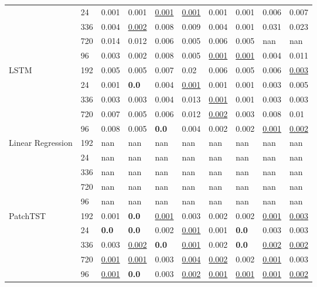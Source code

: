 \begin{tabular}{llllllllll}
 & 24 & 0.001 & 0.001 & \underline{0.001} & \underline{0.001} & 0.001 & 0.001 & 0.006 & 0.007 \\
 & 336 & 0.004 & \underline{0.002} & 0.008 & 0.009 & 0.004 & 0.001 & 0.031 & 0.023 \\
 & 720 & 0.014 & 0.012 & 0.006 & 0.005 & 0.006 & 0.005 & nan & nan \\
 & 96 & 0.003 & 0.002 & 0.008 & 0.005 & \underline{0.001} & \underline{0.001} & 0.004 & 0.011 \\
\cline{1-10}
\multirow[t]{5}{*}{LSTM} & 192 & 0.005 & 0.005 & 0.007 & 0.02 & 0.006 & 0.005 & 0.006 & \underline{0.003} \\
 & 24 & 0.001 & \textbf{0.0} & 0.004 & \underline{0.001} & 0.001 & 0.001 & 0.003 & 0.005 \\
 & 336 & 0.003 & 0.003 & 0.004 & 0.013 & \underline{0.001} & 0.001 & 0.003 & 0.003 \\
 & 720 & 0.007 & 0.005 & 0.006 & 0.012 & \underline{0.002} & 0.003 & 0.008 & 0.01 \\
 & 96 & 0.008 & 0.005 & \textbf{0.0} & 0.004 & 0.002 & 0.002 & \underline{0.001} & \underline{0.002} \\
\cline{1-10}
\multirow[t]{5}{*}{Linear Regression} & 192 & nan & nan & nan & nan & nan & nan & nan & nan \\
 & 24 & nan & nan & nan & nan & nan & nan & nan & nan \\
 & 336 & nan & nan & nan & nan & nan & nan & nan & nan \\
 & 720 & nan & nan & nan & nan & nan & nan & nan & nan \\
 & 96 & nan & nan & nan & nan & nan & nan & nan & nan \\
\cline{1-10}
\multirow[t]{5}{*}{PatchTST} & 192 & 0.001 & \textbf{0.0} & \underline{0.001} & 0.003 & 0.002 & 0.002 & \underline{0.001} & \underline{0.003} \\
 & 24 & \textbf{0.0} & \textbf{0.0} & 0.002 & \underline{0.001} & 0.001 & \textbf{0.0} & 0.003 & 0.003 \\
 & 336 & 0.003 & \underline{0.002} & \textbf{0.0} & \underline{0.001} & 0.002 & \textbf{0.0} & \underline{0.002} & \underline{0.002} \\
 & 720 & \underline{0.001} & \underline{0.001} & 0.003 & \underline{0.004} & \underline{0.002} & 0.002 & \underline{0.001} & 0.003 \\
 & 96 & \underline{0.001} & \textbf{0.0} & 0.003 & \underline{0.002} & \underline{0.001} & \underline{0.001} & \underline{0.001} & \underline{0.002} \\

\end{tabular}
